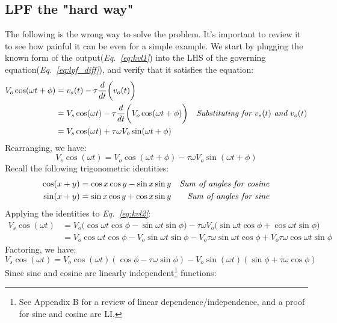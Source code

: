 \subsection{LPF the "hard way"}
The following is the wrong way to solve the problem.  It's important to review it to see how painful it can be even for a simple example.  We start by plugging the known form of the output(\emph{Eq.~\ref{eq:kvl1}}) into the LHS of the governing equation(\emph{Eq.~\ref{eq:lpf_diff}}), and verify that it satisfies the equation:
    \begin{align*}
        V_o \cos(\omega t + \phi) &= v_s(t) - \tau \frac{d}{dt}\bigg( v_o(t) \bigg)\\
        &= V_s \cos(\omega t) - \tau \frac{d}{dt}\bigg( V_o \cos(\omega t + \phi) \bigg)
            &\text{\emph{Substituting for $v_s(t)$ and $v_o(t)$}}\\
        &= V_s \cos(\omega t) + \tau \omega V_o \sin(\omega t + \phi)
    \end{align*}
Rearranging, we have:
    \begin{equation}
        V_s \cos(\omega t) = V_o \cos(\omega t + \phi) - \tau \omega V_o \sin(\omega t + \phi) \label{eq:kvl2}
    \end{equation}
Recall the following trigonometric identities:
    \begin{align*}
        \cos(x + y) &= \cos x \cos y - \sin x \sin y &\text{\emph{Sum of angles for cosine}}\\
        \sin(x + y) &= \sin x \cos y + \cos x \sin y &\text{\emph{Sum of angles for sine}}
    \end{align*}
Applying the identities to \emph{Eq.~\ref{eq:kvl2}}:
    \begin{align*}
        V_s \cos(\omega t) &= V_o \big(\cos \omega t \cos \phi - \sin \omega t \sin \phi \big)
            - \tau \omega V_o \big( \sin \omega t \cos \phi + \cos \omega t \sin \phi \big)\\
        &= V_o \cos \omega t \cos \phi - V_o \sin \omega t \sin \phi
            - V_o \tau \omega \sin \omega t \cos \phi + V_o \tau \omega \cos \omega t \sin \phi
    \end{align*}
Factoring, we have:
    \begin{equation}
        V_s \cos(\omega t) = V_o \cos(\omega t) (\cos \phi - \tau \omega \sin\phi) - V_o \sin(\omega t) (\sin\phi + \tau \omega \cos\phi)
    \end{equation}
Since sine and cosine are linearly independent\footnote{See Appendix B for a review of linear dependence/independence, and a proof for sine and cosine are LI.} functions:

